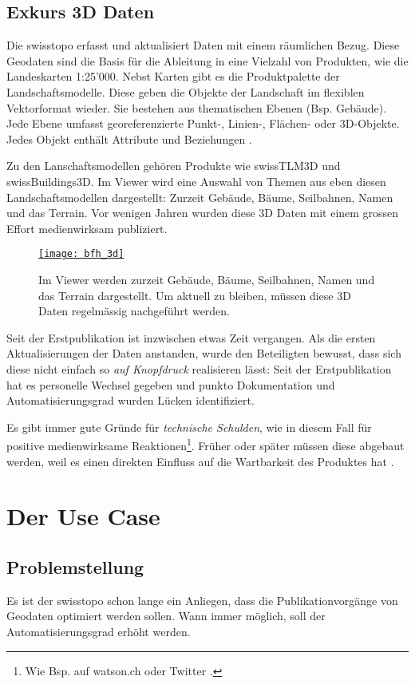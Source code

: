 \newpage

\subsection{Exkurs 3D Daten}
Die swisstopo erfasst und aktualisiert Daten mit einem räumlichen Bezug. Diese Geodaten sind die Basis für die Ableitung in eine Vielzahl von Produkten, wie die Landeskarten 1:25'000. Nebst Karten gibt es die Produktpalette der Landschaftsmodelle. Diese geben die Objekte der Landschaft im flexiblen Vektorformat wieder. Sie bestehen aus thematischen Ebenen (Bsp. Gebäude). Jede Ebene umfasst georeferenzierte Punkt-, Linien-, Flächen- oder 3D-Objekte. Jedes Objekt enthält Attribute und Beziehungen \cite{toposhop2010}.

Zu den Lanschaftsmodellen gehören Produkte wie swissTLM3D und swissBuildings3D. Im Viewer wird eine Auswahl von Themen aus eben diesen Landschaftsmodellen dargestellt: Zurzeit Gebäude, Bäume, Seilbahnen, Namen und das Terrain. Vor wenigen Jahren wurden diese 3D Daten mit einem grossen Effort medienwirksam publiziert.

\begin{figure}[H]
	\centering
	\href{https://s.geo.admin.ch/8a8ce63073}{
	\texttt{[image: bfh\_3d]}}
	\caption{Im Viewer werden zurzeit Gebäude, Bäume, Seilbahnen, Namen und das Terrain dargestellt. Um aktuell zu bleiben, müssen diese 3D Daten regelmässig nachgeführt werden.}
	\label{fig:bfh_3d}
\end{figure}

Seit der Erstpublikation ist inzwischen etwas Zeit vergangen. Als die ersten Aktualisierungen der Daten anstanden, wurde den Beteiligten bewusst, dass sich diese nicht einfach so \emph{auf Knopfdruck} realisieren lässt: Seit der Erstpublikation hat es personelle Wechsel gegeben und punkto Dokumentation und Automatisierungsgrad wurden Lücken identifiziert.

Es gibt immer gute Gründe für \emph{technische Schulden}, wie in diesem Fall für positive medienwirksame Reaktionen\footnote{Wie Bsp. auf watson.ch oder Twitter \cite{watson2018}.}. Früher oder später müssen diese abgebaut werden, weil es einen direkten Einfluss auf die Wartbarkeit des Produktes hat \cite{technischeschulden2010}.

\section{Der Use Case}
\subsection{Problemstellung}
Es ist der swisstopo schon lange ein Anliegen, dass die Publikationvorgänge von Geodaten optimiert werden
sollen. Wann immer möglich, soll der Automatisierungsgrad erhöht werden.

